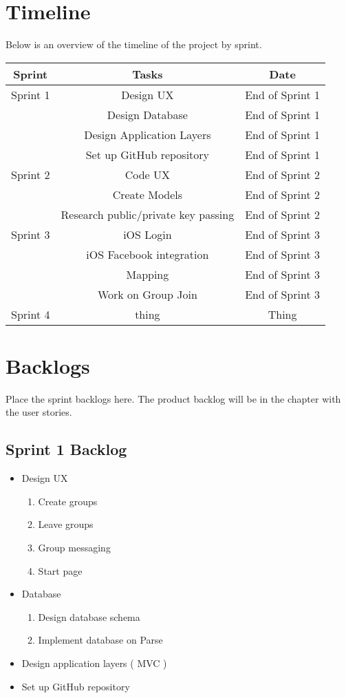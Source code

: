 \section{Timeline}
Below is an overview of the timeline of the project by sprint.
\begin{center}
	\begin{tabular}{c|c|c}
	Sprint & Tasks & Date\\
	\hline
	Sprint 1 &  Design UX & End of Sprint 1\\
	& Design Database&End of Sprint 1\\
	& Design Application Layers & End of Sprint 1\\
	& Set up GitHub repository & End of Sprint 1\\
	\hline
	Sprint 2 & Code UX & End of Sprint 2 \\
	& Create Models & End of Sprint 2\\
	& Research public/private key passing & End of Sprint 2\\
	\hline
	Sprint 3 & iOS Login & End of Sprint 3\\
	& iOS Facebook integration & End of Sprint 3\\
	& Mapping & End of Sprint 3\\
	& Work on Group Join & End of Sprint 3\\
	\hline
	Sprint 4 & thing & Thing\\
	\hline
	\end{tabular}
\end{center}

\section{Backlogs}
Place the sprint backlogs here.    The product backlog will be in the chapter with the user 
stories.
\subsection{Sprint 1 Backlog}
	\begin{itemize}
	\item Design UX
		\begin{enumerate}
		\item Create groups
		\item Leave groups
		\item Group messaging
		\item Start page
		\end{enumerate}
	\item Database
		\begin{enumerate}
		\item Design database schema
		\item Implement database on Parse
		\end{enumerate}
	\item Design application layers ( MVC )
	\item Set up GitHub repository
	\end{itemize}
	
